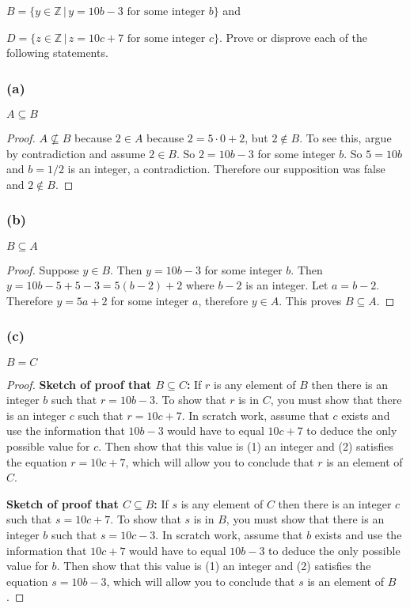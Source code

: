 \documentclass[14pt]{extarticle}
\newcommand{\Z}{\mathbb{Z}}
\begin{document}
\(B = \{y \in \Z \, | \, y = 10b-3 \text{ for some integer } b\}\) and

\(D = \{z \in \Z \, | \, z = 10c+7 \text{ for some integer } c\}\).
Prove or disprove each of the following statements.

\subsubsection{(a)}
\(A \subseteq B\)

\begin{proof}
  \(A \nsubseteq B\) because \(2 \in A\) because \(2 = 5 \cdot 0 + 2\), but \(2 \notin B\). To see this, argue by
  contradiction and assume \(2 \in B\). So \(2 = 10b - 3\) for some integer $b$. So \(5 = 10b\) and \(b = 1/2\) is an
  integer, a contradiction. Therefore our supposition was false and \(2 \notin B\).
\end{proof}

\subsubsection{(b)}
\(B \subseteq A\)

\begin{proof}
  Suppose \(y \in B\). Then \(y = 10b - 3\) for some integer $b$. Then \(y = 10b - 5 + 5 - 3 = 5(b-2) + 2\) where $b-2$
  is an integer. Let \(a = b-2\). Therefore \(y = 5a + 2\) for some integer $a$, therefore \(y \in A\).
  This proves \(B \subseteq A\).
\end{proof}

\subsubsection{(c)}
$B = C$

\begin{proof}
  {\bf Sketch of proof that \(B \subseteq C\):} If $r$ is any element of $B$ then there is an integer $b$ such that
  \(r = 10b - 3\). To show that $r$ is in $C$, you must show that there is an integer $c$ such that \(r = 10c + 7\). In
  scratch work, assume that $c$ exists and use the information that \(10b - 3\) would have to equal
  \(10c + 7\) to deduce the only possible value for $c$. Then show that this value is (1) an integer and (2) satisfies
  the equation \(r = 10c + 7\), which will allow you to conclude that $r$ is an element of $C$.

    {\bf Sketch of proof that \(C \subseteq B\):} If $s$ is any element of $C$ then there is an integer $c$ such that
  \(s = 10c + 7\). To show that $s$ is in $B$, you must show that there is an integer $b$ such that \(s = 10c - 3\). In
  scratch work, assume that $b$ exists and use the information that \(10c + 7\) would have to equal
  \(10b - 3\) to deduce the only possible value for $b$. Then show that this value is (1) an integer and (2) satisfies
  the equation \(s = 10b - 3\), which will allow you to conclude that $s$ is an element of $B$.
\end{proof}
\end{document}
